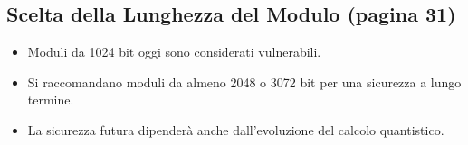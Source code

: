\documentclass{report}
\begin{document}
\subsection{Scelta della Lunghezza del Modulo (pagina 31)}
\begin{itemize}
  \item Moduli da 1024 bit oggi sono considerati vulnerabili.
  \item Si raccomandano moduli da almeno 2048 o 3072 bit per una sicurezza a lungo termine.
  \item La sicurezza futura dipender\`a anche dall'evoluzione del calcolo quantistico.
\end{itemize}

  
\end{document}
